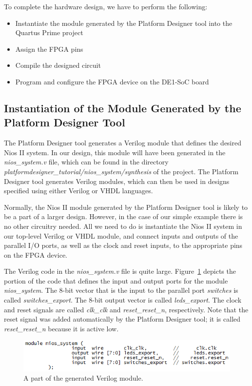 \documentclass[11pt, twoside, pdftex]{article}
\begin{document}
To complete the hardware design, we have to perform the following:

\begin{itemize}
\item Instantiate the module generated by the Platform Designer tool into the Quartus Prime project
\item Assign the FPGA pins
\item Compile the designed circuit
\item Program and configure the FPGA device on the DE1-SoC board
\end{itemize}

\subsection{Instantiation of the Module Generated by the Platform Designer Tool}

The Platform Designer tool generates a Verilog module
that defines the desired Nios II system.
In our design, this module will have been generated in the {\it nios\_system.v} file,
which can be found in the directory 
{\it platformdesigner\_tutorial/nios\_system/synthesis} of the project.
The Platform Designer tool generates Verilog modules, which can then be used in designs
specified using either Verilog or VHDL languages.

Normally, the Nios II module generated by the Platform Designer tool is likely to be a part of a larger design. 
However, in the case of our simple example there is no other circuitry needed. 
All we need to do is instantiate the
Nios II system in our top-level Verilog or VHDL module, and connect inputs and outputs 
of the parallel I/O ports, as well as the clock and reset inputs, to the appropriate
pins on the FPGA device.

The Verilog code in the {\it nios\_system.v} file is quite large. Figure~\ref{fig:21} depicts
the portion of the code that defines the input and output ports for the
module {\it nios\_system}. The 8-bit vector that is the input to the parallel port 
{\it switches} is called {\it switches\_export}. 
The 8-bit output vector is called {\it leds\_export}. 
The clock and reset signals are called {\it clk\_clk} and {\it reset\_reset\_n}, respectively.
Note that the reset signal was added automatically by the Platform Designer tool;
it is called {\it reset\_reset\_n} because it is active low.
~\\

\begin{figure}[H]
   \begin{center}
      \includegraphics[scale=.6]{figures/figure21.png}
   \end{center}
   \caption{A part of the generated Verilog module.} 
	\label{fig:21}
\end{figure}
\end{document}
